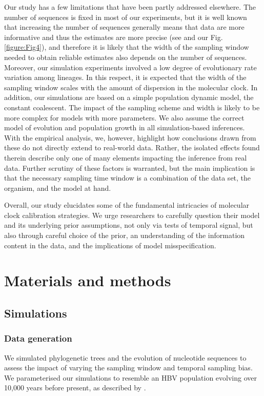 \documentclass[11pt]{article}
\begin{document}
Our study has a few limitations that have been partly addressed elsewhere. The number of sequences is fixed in most of our experiments, but it is well known that increasing the number of sequences generally means that data are more informative and thus the estimates are more precise (see \cite{moller2018impact} and our Fig.\ref{figure:Fig4}), and therefore it is likely that the width of the sampling window needed to obtain reliable estimates also depends on the number of sequences. Moreover, our simulation experiments involved a low degree of evolutionary rate variation among lineages. In this respect, it is expected that the width of the sampling window scales with the amount of dispersion in the molecular clock. In addition, our simulations are based on a simple population dynamic model, the constant coalescent. The impact of the sampling scheme and width is likely to be more complex for models with more parameters. We also assume the correct model of evolution and population growth in all simulation-based inferences. With the empirical analysis, we, however, highlight how conclusions drawn from these do not directly extend to real-world data. Rather, the isolated effects found therein describe only one of many elements impacting the inference from real data. Further scrutiny of these factors is warranted, but the main implication is that the necessary sampling time window is a combination of the data set, the organism, and the model at hand. 

Overall, our study elucidates some of the fundamental intricacies of molecular clock calibration strategies. We urge researchers to carefully question their model and its underlying prior assumptions, not only via tests of temporal signal, but also through careful choice of the prior, an understanding of the information content in the data, and the implications of model misspecification.

\section{Materials and methods}
\subsection{Simulations}
\subsubsection{Data generation}
We simulated phylogenetic trees and the evolution of nucleotide sequences to assess the impact of varying the sampling window and temporal sampling bias. We parameterised our simulations to resemble an HBV population evolving over 10,000 years before present, as described by \cite{kocher2021ten}. 
\end{document}
